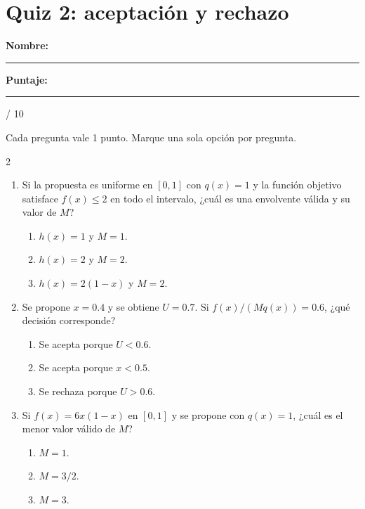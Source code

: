 \documentclass[11pt]{article}
\begin{document}
\section*{Quiz 2: aceptación y rechazo}

\textbf{Nombre:} \rule{7cm}{0.4pt}\hfill
\textbf{Puntaje:} \rule{1.5cm}{0.4pt} / 10

Cada pregunta vale 1 punto. Marque una sola opción por pregunta.

\begingroup
\setlength{\parskip}{0pt}
\begin{multicols}{2}
\raggedright{}
\begin{enumerate}
    \setlength{\itemsep}{0.7em}
    \item
    \begin{samepage}
    Si la propuesta es uniforme en $[0,1]$ con $q(x)=1$ y la función
    objetivo satisface $f(x)\leq 2$ en todo el intervalo, ¿cuál es una
    envolvente válida y su valor de $M$?
    \begin{enumerate}
        \item $h(x)=1$ y $M=1$.
        \item $h(x)=2$ y $M=2$.
        \item $h(x)=2(1-x)$ y $M=2$.
    \end{enumerate}

\end{samepage}

    \item
    \begin{samepage}
    Se propone $x=0.4$ y se obtiene $U=0.7$. Si
    $f(x)/(Mq(x))=0.6$, ¿qué decisión corresponde?
    \begin{enumerate}
        \item Se acepta porque $U<0.6$.
        \item Se acepta porque $x<0.5$.
        \item Se rechaza porque $U>0.6$.
    \end{enumerate}

\end{samepage}

    \item
    \begin{samepage}
    Si $f(x)=6x(1-x)$ en $[0,1]$ y se propone con $q(x)=1$, ¿cuál es
    el menor valor válido de $M$?
    \begin{enumerate}
        \item $M=1$.
        \item $M=3/2$.
        \item $M=3$.
    \end{enumerate}


\end{samepage}
\end{enumerate}
\end{multicols}
\end{document}

